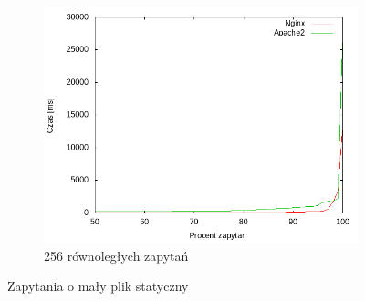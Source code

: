 \begin{figure}
\begin{subfigure}[h]{0.3\textwidth}
		\includegraphics[width=\textwidth]{testy/wybor_index_maly_256.png}
		\caption{256 równoległych zapytań}
	\end{subfigure}
	\caption{Zapytania o mały plik statyczny}\label{fig:wyb_index_maly}
\end{figure}
